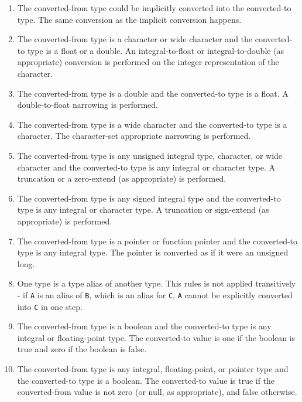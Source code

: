 \documentclass[letterpaper,12pt]{book}
\begin{document}
\begin{enumerate}
	\item The converted-from type could be implicitly converted into the converted-to type. The same conversion as the implicit conversion happens.
	
	\item The converted-from type is a character or wide character and the converted-to type is a float or a double. An integral-to-float or integral-to-double (as appropriate) conversion is performed on the integer representation of the character.
	
	\item The converted-from type is a double and the converted-to type is a float. A double-to-float narrowing is performed.
	
	\item The converted-from type is a wide character and the converted-to type is a character. The character-set appropriate narrowing is performed.
	
	\item The converted-from type is any unsigned integral type, character, or wide character and the converted-to type is any integral or character type. A truncation or a zero-extend (as appropriate) is performed.
	
	\item The converted-from type is any signed integral type and the converted-to type is any integral or character type. A truncation or sign-extend (as appropriate) is performed.
	
	\item The converted-from type is a pointer or function pointer and the converted-to type is any integral type. The pointer is converted as if it were an unsigned long.
	
	\item One type is a type alias of another type. This rules is not applied transitively - if \texttt{A} is an alias of \texttt{B}, which is an alias for \texttt{C}, \texttt{A} cannot be explicitly converted into \texttt{C} in one step.
	
	\item The converted-from type is a boolean and the converted-to type is any integral or floating-point type. The converted-to value is one if the boolean is true and zero if the boolean is false.
	
	\item The converted-from type is any integral, floating-point, or pointer type and the converted-to type is a boolean. The converted-to value is true if the converted-from value is not zero (or null, as appropriate), and false otherwise.
	

\end{enumerate}
\end{document}
